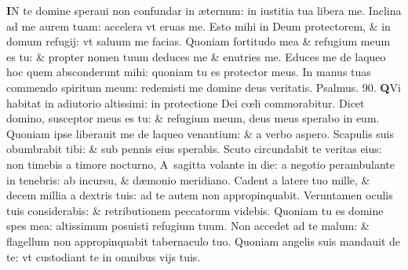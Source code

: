 \documentclass[a5paper,10pt]{book}
\def\ae{æ}
\def\oe{œ}
\begin{document}
\begin{multicols*}{2}
\lettrine[lines=2]{\bfseries \color{red} I}{}N te domine speraui non confundar in \ae ternum: in iustitia tua libera me.
\newline \color{red} I\color{black}nclina ad me aurem tuam: accelera vt eruas me.
\newline \color{red} E\color{black}sto mihi in Deum protectorem, \& in domum refugij: vt saluum me facias.
\newline \color{red} Q\color{black}uoniam fortitudo mea \& refugium meum es tu: \& propter nomen tuum deduces me \& enutries me.
\newline \color{red} E\color{black}duces me de laqueo hoc quem absconderunt mihi: quoniam tu es protector meus.
\newline \color{red} I\color{black}n manus tuas commendo spiritum meum: redemisti me domine deus veritatis. \quad \color{red} Psalmus. 90. \color{black}
\lettrine[lines=2]{\bfseries \color{red} Q}{}Vi habitat in adiutorio altissimi: in protectione Dei c\oe li commorabitur.
\newline \color{red} D\color{black}icet domino, susceptor meus es tu: \& refugium meum, deus meus sperabo in eum.
\newline \color{red} Q\color{black}uoniam ipse liberauit me de laqueo venantium: \& a verbo aspero.
\newline \color{red} S\color{black}capulis suis obumbrabit tibi: \& sub pennis eius sperabis.
\newline \color{red} S\color{black}cuto circundabit te veritas eius: non timebis a timore nocturno,
\newline \color{red} A\color{black}\ sagitta volante in die: a negotio perambulante in tenebris: ab incursu, \& d\ae monio meridiano.
\newline \color{red} C\color{black}adent a latere tuo mille, \& decem millia a dextris tuis: ad te autem non appropinquabit.
\newline \color{red} V\color{black}eruntamen oculis tuis considerabis: \& retributionem peccatorum videbis.
\newline \color{red} Q\color{black}uoniam tu es domine spes mea: altissimum posuisti refugium tuum.
\newline \color{red} N\color{black}on accedet ad te malum: \& flagellum non appropinquabit tabernaculo tuo.
\newline \color{red} Q\color{black}uoniam angelis suis mandauit de te: vt custodiant te in omnibus vijs tuis.

\end{multicols*}
\end{document}
